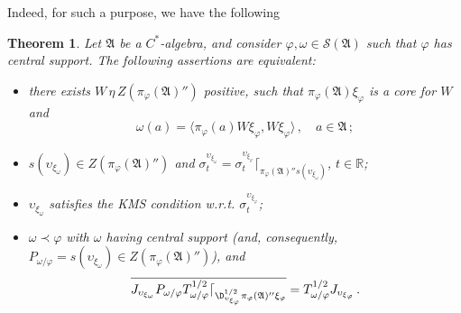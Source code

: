 \documentclass[12pt]{amsart}
\numberwithin{equation}{section}
\def\cs{{\mathcal S}}
\def\ga{{\mathfrak A}} \def\gpa{{\mathfrak a}}
\def\br{{\mathbb R}}
\def\s{\sigma} \def\S{\Sigma}
\def\f{\varphi}\def\ff{\phi} \def\F{\Phi}
\def\om{\omega} \def\Om{\Omega}
\newtheorem{thm}{Theorem}[section]
\begin{document}
Indeed, for such a purpose, we have the following
\begin{thm}
\label{pedtake}
Let $\ga$ be a $C^*$-algebra, and consider $\f,\om\in\cs(\ga)$ such that $\f$ has central support. 
The following assertions are equivalent:
\begin{itemize}
\item[(i)] there exists $W\,\eta\,Z(\pi_\f(\ga)'')$ positive, such that $\pi_\f(\ga)\xi_\f$ is a core for $W$ and
$$
\om(a)=\langle\pi_\f(a)W\xi_\f,W\xi_\f\rangle\,,\quad a\in\ga\,;
$$
\item[(ii)] $s(\upsilon_{\xi_\om})\in Z(\pi_\f(\ga)'')$ and 
$\s_t^{\upsilon_{\xi_\om}}=\s_t^{\upsilon_{\xi_\f}}\lceil_{\pi_\f(\ga)''s(\upsilon_{\xi_\om})}$, $t\in\br$;
\item[(iii)] $\upsilon_{\xi_\om}$ satisfies the KMS condition w.r.t. $\s_t^{\upsilon_{\xi_\f}}$;
\item[(iv)] $\om\prec\f$ with $\om$ having central support (and, consequently, 
$P_{\om/\f}=s(\upsilon_{\xi_\om})\in Z(\pi_\f(\ga)'')$), and 
$$
\overline{J_{\upsilon_{\xi_\om}} P_{\om/\f}T^{1/2}_{\om/\f}\lceil_{\D^{1/2}_{\upsilon_{\xi_\f}}\pi_\f(\ga)''\xi_\f}}=T^{1/2}_{\om/\f}J_{\upsilon_{\xi_\f}}\,.
$$
\end{itemize}
\end{thm}
\end{document}
